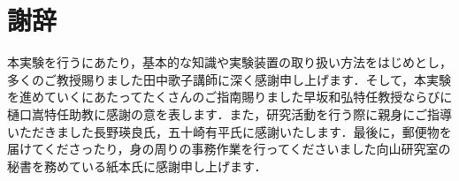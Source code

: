\chapter{謝辞}
本実験を行うにあたり，基本的な知識や実験装置の取り扱い方法をはじめとし，多くのご教授賜りました田中歌子講師に深く感謝申し上げます．そして，本実験を進めていくにあたってたくさんのご指南賜りました早坂和弘特任教授ならびに樋口嵩特任助教に感謝の意を表します．また，研究活動を行う際に親身にご指導いただきました長野瑛良氏，五十崎有平氏に感謝いたします．最後に，郵便物を届けてくださったり，身の周りの事務作業を行ってくださいました向山研究室の秘書を務めている紙本氏に感謝申し上げます．	